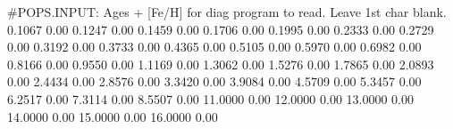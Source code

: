 #POPS.INPUT:  Ages + [Fe/H] for diag program to read. Leave 1st char blank.
    0.1067   0.00
    0.1247   0.00
    0.1459   0.00
    0.1706   0.00
    0.1995   0.00
    0.2333   0.00
    0.2729   0.00
    0.3192   0.00
    0.3733   0.00
    0.4365   0.00
    0.5105   0.00
    0.5970   0.00
    0.6982   0.00
    0.8166   0.00
    0.9550   0.00
    1.1169   0.00
    1.3062   0.00
    1.5276   0.00
    1.7865   0.00
    2.0893   0.00
    2.4434   0.00
    2.8576   0.00
    3.3420   0.00
    3.9084   0.00
    4.5709   0.00
    5.3457   0.00
    6.2517   0.00
    7.3114   0.00
    8.5507   0.00
   11.0000   0.00
   12.0000   0.00
   13.0000   0.00
   14.0000   0.00
   15.0000   0.00
   16.0000   0.00